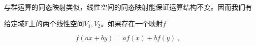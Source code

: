 

与群运算的同态映射类似，线性空间的同态映射能保证运算结构不变。因而我们有
\begin{definition}{}
给定域$\mathbb F$上的两个线性空间$V_1,V_2$。如果存在一个映射$f$
\end{definition}
\begin{equation}
f(ax+by)=af(x)+bf(y)~,
\end{equation}
